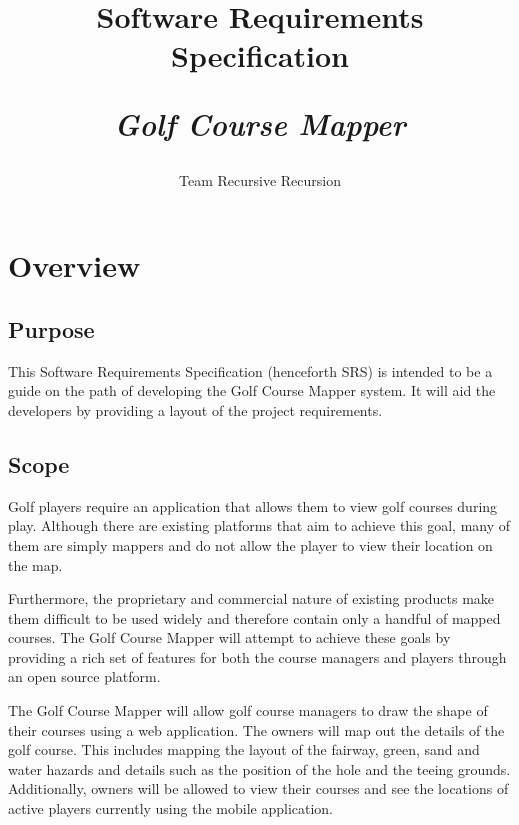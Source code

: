 \documentclass{article}
\title{
    Software Requirements Specification\\
    \begin{large}
        \textit{Golf Course Mapper}
    \end{large}
}
\date{
    \begin{small}
        \today
    \end{small}
}
\author{
    Team Recursive Recursion
}
\begin{document}
    \maketitle
    \newpage

    \tableofcontents
    \newpage


    
    \section{Overview}

    \subsection{Purpose}

    This Software Requirements Specification (henceforth SRS) is intended to be
    a guide on the path of developing the Golf Course Mapper system. It will
    aid the developers by providing a layout of the project requirements.

    \subsection{Scope}

    Golf players require an application that allows them to view golf courses
    during play. Although there are existing platforms that aim to achieve this
    goal, many of them are simply mappers and do not allow the player to view
    their location on the map.
    
    Furthermore, the proprietary and commercial nature of existing products
    make them difficult to be used widely and therefore contain only a handful
    of mapped courses. The Golf Course Mapper will attempt to achieve these
    goals by providing a rich set of features for both the course managers and
    players through an open source platform.

    The Golf Course Mapper will allow golf course managers to draw the shape of
    their courses using a web application. The owners will map out the details
    of the golf course. This includes mapping the layout of the fairway, green,
    sand and water hazards and details such as the position of the hole and the
    teeing grounds. Additionally, owners will be allowed to view their courses
    and see the locations of active players currently using the mobile
    application.
\end{document}
